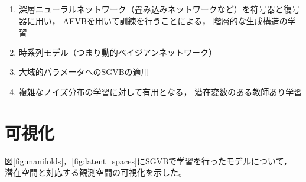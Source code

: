 \documentclass[dvipdfmx, fleqn, draft]{jsarticle}
\begin{document}
\begin{enumerate}[label=(\roman*)]
    \item
        深層ニューラルネットワーク（畳み込みネットワークなど）を符号器と復号器に用い，
        AEVBを用いて訓練を行うことによる，
        階層的な生成構造の学習
    \item
        時系列モデル（つまり動的ベイジアンネットワーク）
    \item
        大域的パラメータへのSGVBの適用
    \item
        複雑なノイズ分布の学習に対して有用となる，
        潜在変数のある教師あり学習
\end{enumerate}



\appendix

\section{可視化}

図\ref{fig:manifolds}，\ref{fig:latent_spaces}にSGVBで学習を行ったモデルについて，
潜在空間と対応する観測空間の可視化を示した。
\end{document}
